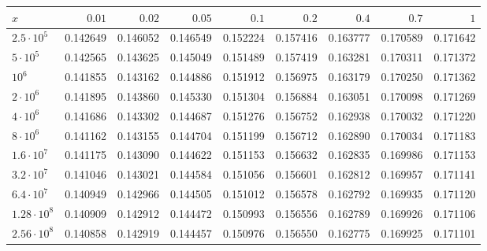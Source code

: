 \begin{tabular}{lrrrrrrrr}
\toprule
$x$ & $0.01$ & $0.02$ & $0.05$ & $0.1$ & $0.2$ & $0.4$ & $0.7$ & $1$ \\
\midrule
$2.5\cdot 10^{5}$ & 0.142649 & 0.146052 & 0.146549 & 0.152224 & 0.157416 & 0.163777 & 0.170589 & 0.171642 \\
$5\cdot 10^{5}$ & 0.142565 & 0.143625 & 0.145049 & 0.151489 & 0.157419 & 0.163281 & 0.170311 & 0.171372 \\
$10^{6}$ & 0.141855 & 0.143162 & 0.144886 & 0.151912 & 0.156975 & 0.163179 & 0.170250 & 0.171362 \\
$2\cdot 10^{6}$ & 0.141895 & 0.143860 & 0.145330 & 0.151304 & 0.156884 & 0.163051 & 0.170098 & 0.171269 \\
$4\cdot 10^{6}$ & 0.141686 & 0.143302 & 0.144687 & 0.151276 & 0.156752 & 0.162938 & 0.170032 & 0.171220 \\
$8\cdot 10^{6}$ & 0.141162 & 0.143155 & 0.144704 & 0.151199 & 0.156712 & 0.162890 & 0.170034 & 0.171183 \\
$1.6\cdot 10^{7}$ & 0.141175 & 0.143090 & 0.144622 & 0.151153 & 0.156632 & 0.162835 & 0.169986 & 0.171153 \\
$3.2\cdot 10^{7}$ & 0.141046 & 0.143021 & 0.144584 & 0.151056 & 0.156601 & 0.162812 & 0.169957 & 0.171141 \\
$6.4\cdot 10^{7}$ & 0.140949 & 0.142966 & 0.144505 & 0.151012 & 0.156578 & 0.162792 & 0.169935 & 0.171120 \\
$1.28\cdot 10^{8}$ & 0.140909 & 0.142912 & 0.144472 & 0.150993 & 0.156556 & 0.162789 & 0.169926 & 0.171106 \\
$2.56\cdot 10^{8}$ & 0.140858 & 0.142919 & 0.144457 & 0.150976 & 0.156550 & 0.162775 & 0.169925 & 0.171101 \\
\bottomrule
\end{tabular}
